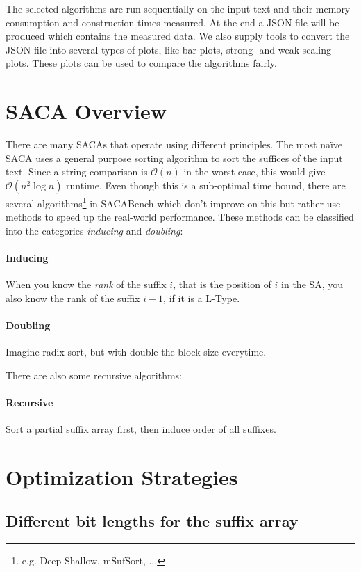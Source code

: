 The selected algorithms are run sequentially on the input text and their memory consumption
and construction times measured.
At the end a JSON file will be produced which contains the measured data.
We also supply tools to convert the JSON file into several types of plots, like bar plots, strong- and weak-scaling plots.
These plots can be used to compare the algorithms fairly.

\section{SACA Overview}

There are many SACAs that operate using different principles.
The most na\"ive SACA uses a general purpose sorting algorithm to sort the suffices of the input text.
Since a string comparison is $\mathcal O (n)$ in the worst-case, this would give $\mathcal O (n^2 \log n)$ runtime.
Even though this is a sub-optimal time bound,
there are several algorithms\footnote{e.g. Deep-Shallow, mSufSort, ...} in SACABench which don't improve on this
but rather use methods to speed up the real-world performance.
These methods can be classified into the categories \emph{inducing} and \emph{doubling}:
%
\paragraph{Inducing} When you know the \emph{rank} of the suffix $i$, that is the position of $i$ in the SA, you also know the rank of the suffix $i-1$, if it is a L-Type.
\paragraph{Doubling} Imagine radix-sort, but with double the block size everytime. 

\bigskip

There are also some recursive algorithms:
%
\paragraph{Recursive} Sort a partial suffix array first, then induce order of all suffixes.

\bigskip

\section{Optimization Strategies}
\subsection{Different bit lengths for the suffix array}

